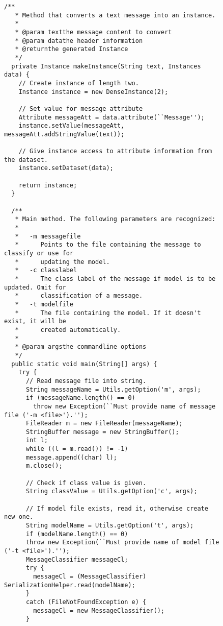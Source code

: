 \begin{figure}[!thp]
\ContinuedFloat
\begin{mdframed}[innermargin=-1cm]
\begin{Verbatim}[fontsize=\scriptsize]
  /**
   * Method that converts a text message into an instance.
   *
   * @param textthe message content to convert
   * @param datathe header information
   * @returnthe generated Instance
   */
  private Instance makeInstance(String text, Instances data) {
    // Create instance of length two.
    Instance instance = new DenseInstance(2);

    // Set value for message attribute
    Attribute messageAtt = data.attribute(``Message'');
    instance.setValue(messageAtt, messageAtt.addStringValue(text));

    // Give instance access to attribute information from the dataset.
    instance.setDataset(data);

    return instance;
  }

  /**
   * Main method. The following parameters are recognized:
   *
   *   -m messagefile
   *      Points to the file containing the message to classify or use for
   *      updating the model.
   *   -c classlabel
   *      The class label of the message if model is to be updated. Omit for
   *      classification of a message.
   *   -t modelfile
   *      The file containing the model. If it doesn't exist, it will be
   *      created automatically.
   *
   * @param argsthe commandline options
   */
  public static void main(String[] args) {
    try {
      // Read message file into string.
      String messageName = Utils.getOption('m', args);
      if (messageName.length() == 0)
        throw new Exception(``Must provide name of message file ('-m <file>').'');
      FileReader m = new FileReader(messageName);
      StringBuffer message = new StringBuffer();
      int l;
      while ((l = m.read()) != -1)
      message.append((char) l);
      m.close();

      // Check if class value is given.
      String classValue = Utils.getOption('c', args);

      // If model file exists, read it, otherwise create new one.
      String modelName = Utils.getOption('t', args);
      if (modelName.length() == 0)
      throw new Exception(``Must provide name of model file ('-t <file>').'');
      MessageClassifier messageCl;
      try {
        messageCl = (MessageClassifier) SerializationHelper.read(modelName);
      }
      catch (FileNotFoundException e) {
        messageCl = new MessageClassifier();
      }


\end{Verbatim}
\end{mdframed}
\end{figure}
